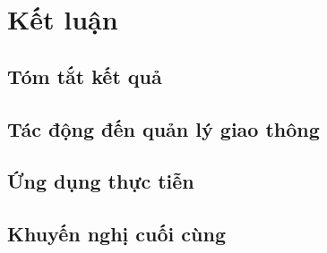 \chapter{Kết luận}
\section{Tóm tắt kết quả}
\section{Tác động đến quản lý giao thông}
\section{Ứng dụng thực tiễn}
\section{Khuyến nghị cuối cùng}
